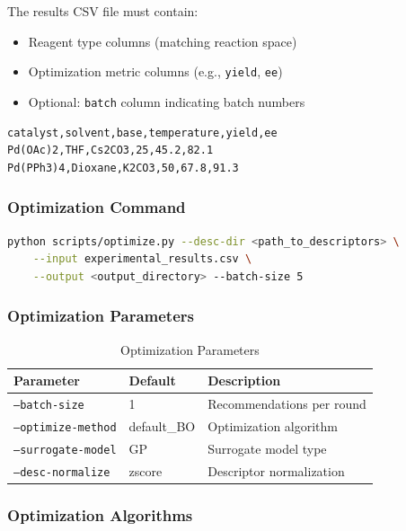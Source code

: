 \documentclass[12pt,a4paper]{article}
\begin{document}
The results CSV file must contain:
\begin{itemize}
    \item Reagent type columns (matching reaction space)
    \item Optimization metric columns (e.g., \texttt{yield}, \texttt{ee})
    \item Optional: \texttt{batch} column indicating batch numbers
\end{itemize}

\begin{lstlisting}[language=csv]
catalyst,solvent,base,temperature,yield,ee
Pd(OAc)2,THF,Cs2CO3,25,45.2,82.1
Pd(PPh3)4,Dioxane,K2CO3,50,67.8,91.3
\end{lstlisting}

\subsubsection{Optimization Command}

\begin{lstlisting}[language=bash]
python scripts/optimize.py --desc-dir <path_to_descriptors> \
    --input experimental_results.csv \
    --output <output_directory> --batch-size 5
\end{lstlisting}

\subsubsection{Optimization Parameters}

\begin{table}[h]
\centering
\caption{Optimization Parameters}
\begin{tabular}{lll}
\toprule
\textbf{Parameter} & \textbf{Default} & \textbf{Description} \\
\midrule
\texttt{--batch-size} & 1 & Recommendations per round \\
\texttt{--optimize-method} & default\_BO & Optimization algorithm \\
\texttt{--surrogate-model} & GP & Surrogate model type \\
\texttt{--desc-normalize} & zscore & Descriptor normalization \\
\bottomrule
\end{tabular}
\end{table}

\subsubsection{Optimization Algorithms}
\end{document}
